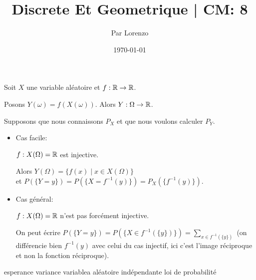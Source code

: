 \documentclass[a4paper, 12pt]{article}
\title{Discrete Et Geometrique | CM: 8}
\author{Par Lorenzo}
\date{\today}
\begin{document}
\maketitle

\begin{proposition}
    Soit $X$ une variable aléatoire et $f: \mathbb{R} \to \mathbb{R}$.

    Posons $Y(\omega) = f(X(\omega))$.
    Alors $Y: \Omega \to \mathbb{R}$.

    Supposons que nous connaissons $P_X$ et que nous voulons calculer $P_Y$.

    \begin{itemize}
        \item Cas facile:
        
        $f: X(\Omega) = \mathbb{R}$ est injective.
        
        Alors $Y(\Omega) = \{f(x) \mid x \in X(\Omega)\}$ \\et $P(\{Y = y\}) = P(\{X = f^{-1}(y)\}) = P_X(\{f^{-1}(y)\})$.
    
        \item Cas général:
        
        $f: X(\Omega) = \mathbb{R}$ n'est pas forcément injective.

        On peut écrire $P(\{Y = y\}) = P(\{X \in f^{-1}(\{y\})\}) = \sum_{x \in f^{-1}(\{y\})}$ (on différencie bien $f^{-1}(y)$ avec celui du cas injectif, ici c'est l'image réciproque et non la fonction réciproque).
    \end{itemize}
\end{proposition}

esperance
variance
variablea aléatoire indépendante
loi de probabilité
\end{document}
